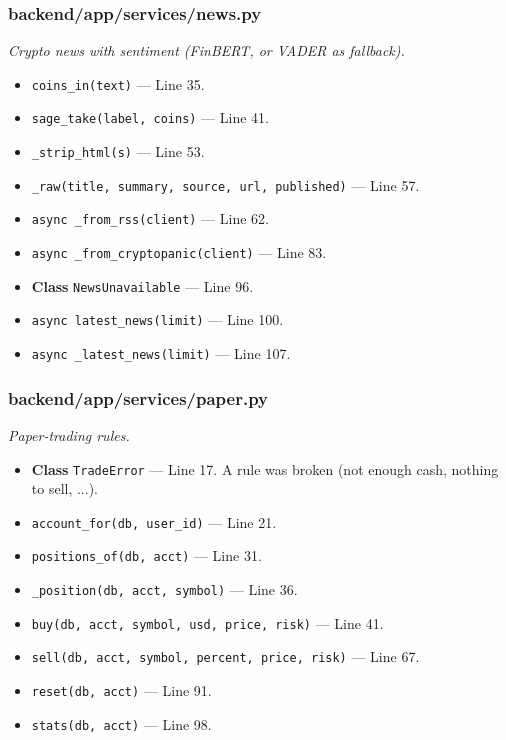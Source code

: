 \subsubsection*{backend/app/services/news.py}
\textit{Crypto news with sentiment (FinBERT, or VADER as fallback).}
\begin{itemize}[nosep,leftmargin=1.5em]
\item \texttt{coins\_\allowbreak{}in(\allowbreak{}text)} --- Line 35.
\item \texttt{sage\_\allowbreak{}take(\allowbreak{}label,\allowbreak{} coins)} --- Line 41.
\item \texttt{\_\allowbreak{}strip\_\allowbreak{}html(\allowbreak{}s)} --- Line 53.
\item \texttt{\_\allowbreak{}raw(\allowbreak{}title,\allowbreak{} summary,\allowbreak{} source,\allowbreak{} url,\allowbreak{} published)} --- Line 57.
\item \texttt{async \_\allowbreak{}from\_\allowbreak{}rss(\allowbreak{}client)} --- Line 62.
\item \texttt{async \_\allowbreak{}from\_\allowbreak{}cryptopanic(\allowbreak{}client)} --- Line 83.
\item \textbf{Class} \texttt{NewsUnavailable} --- Line 96.
\item \texttt{async latest\_\allowbreak{}news(\allowbreak{}limit)} --- Line 100.
\item \texttt{async \_\allowbreak{}latest\_\allowbreak{}news(\allowbreak{}limit)} --- Line 107.
\end{itemize}
\subsubsection*{backend/app/services/paper.py}
\textit{Paper-trading rules.}
\begin{itemize}[nosep,leftmargin=1.5em]
\item \textbf{Class} \texttt{TradeError} --- Line 17. A rule was broken (not enough cash, nothing to sell, ...).
\item \texttt{account\_\allowbreak{}for(\allowbreak{}db,\allowbreak{} user\_\allowbreak{}id)} --- Line 21.
\item \texttt{positions\_\allowbreak{}of(\allowbreak{}db,\allowbreak{} acct)} --- Line 31.
\item \texttt{\_\allowbreak{}position(\allowbreak{}db,\allowbreak{} acct,\allowbreak{} symbol)} --- Line 36.
\item \texttt{buy(\allowbreak{}db,\allowbreak{} acct,\allowbreak{} symbol,\allowbreak{} usd,\allowbreak{} price,\allowbreak{} risk)} --- Line 41.
\item \texttt{sell(\allowbreak{}db,\allowbreak{} acct,\allowbreak{} symbol,\allowbreak{} percent,\allowbreak{} price,\allowbreak{} risk)} --- Line 67.
\item \texttt{reset(\allowbreak{}db,\allowbreak{} acct)} --- Line 91.
\item \texttt{stats(\allowbreak{}db,\allowbreak{} acct)} --- Line 98.
\end{itemize}
